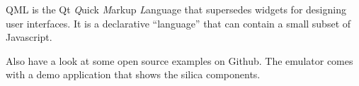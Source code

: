 QML\cite{qt05} is the Qt \emph{Q}uick \emph{M}arkup \emph{L}anguage\cite{qt06} that supersedes widgets for designing user interfaces. It is a declarative ``language'' that can contain a small subset of Javascript.
%

Also have a look at some open source examples on Github\cite{sailfishos5}.
The emulator comes with a demo application that shows the silica components.
%
\begin{figure}[H]
\centering
{}
\end{figure}

